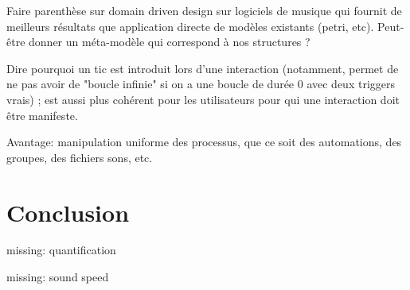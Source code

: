 \documentclass{article}
\begin{document}
Faire parenthèse sur domain driven design sur logiciels de musique qui fournit de meilleurs résultats que application directe de modèles existants (petri, etc).
Peut-être donner un méta-modèle qui correspond à nos structures ?

Dire pourquoi un tic est introduit lors d'une interaction (notamment, permet de ne pas avoir de "boucle infinie" si on a une boucle de durée 0 avec deux triggers vrais) ; est aussi plus cohérent pour les utilisateurs pour qui une interaction doit être manifeste.

Avantage: manipulation uniforme des processus, que ce soit des automations, des groupes, des fichiers sons, etc.
\section{Conclusion}

missing: quantification

missing: sound speed



\end{document}
